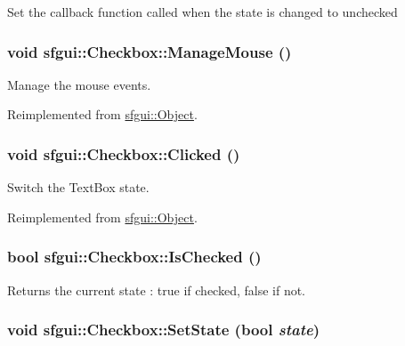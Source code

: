 Set the callback function called when the state is changed to unchecked \hypertarget{classsfgui_1_1Checkbox_a49cffa3e2bef0e96105cd9a9103e294}{
\subsubsection[ManageMouse]{\setlength{\rightskip}{0pt plus 5cm}void sfgui::Checkbox::ManageMouse ()}}
\label{classsfgui_1_1Checkbox_a49cffa3e2bef0e96105cd9a9103e294}




Manage the mouse events. 

Reimplemented from \hyperlink{classsfgui_1_1Object_3332575d988f9eee589f57b2ad516593}{sfgui::Object}.\hypertarget{classsfgui_1_1Checkbox_9dc5f05d2f6d960d9fd50c77be3b7d6f}{
\subsubsection[Clicked]{\setlength{\rightskip}{0pt plus 5cm}void sfgui::Checkbox::Clicked ()}}
\label{classsfgui_1_1Checkbox_9dc5f05d2f6d960d9fd50c77be3b7d6f}




Switch the TextBox state. 

Reimplemented from \hyperlink{classsfgui_1_1Object_da7f84701d318ce93fe59cc2f571eaf2}{sfgui::Object}.\hypertarget{classsfgui_1_1Checkbox_d38e389867fdfdc63d2c05955c9a2e72}{
\subsubsection[IsChecked]{\setlength{\rightskip}{0pt plus 5cm}bool sfgui::Checkbox::IsChecked ()}}
\label{classsfgui_1_1Checkbox_d38e389867fdfdc63d2c05955c9a2e72}




Returns the current state : true if checked, false if not. \hypertarget{classsfgui_1_1Checkbox_f5e56a1a1c49ff8437118061f709871b}{
\subsubsection[SetState]{\setlength{\rightskip}{0pt plus 5cm}void sfgui::Checkbox::SetState (bool {\em state})}}
\label{classsfgui_1_1Checkbox_f5e56a1a1c49ff8437118061f709871b}




